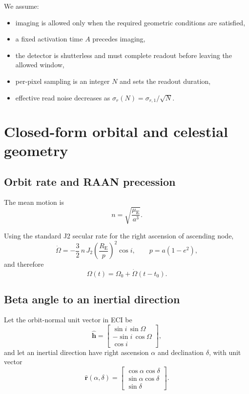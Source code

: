 \documentclass[preprint,12pt]{elsarticle}
\newcommand{\Rearth}{R_{\mathrm{E}}}
\newcommand{\muearth}{\mu_{\mathrm{E}}}
\newcommand{\Jtwo}{J_{2}}
\theoremstyle{definition}
\theoremstyle{remark}
\begin{document}
We assume:
\begin{itemize}
\item imaging is allowed only when the required geometric conditions are satisfied,
\item a fixed activation time $A$ precedes imaging,
\item the detector is shutterless and must complete readout before leaving the allowed window,
\item per-pixel sampling is an integer $N$ and sets the readout duration,
\item effective read noise decreases as $\sigma_r(N)=\sigma_{r,1}/\sqrt{N}$.
\end{itemize}

\section{Closed-form orbital and celestial geometry}

\subsection{Orbit rate and RAAN precession}

The mean motion is
\begin{equation}
n=\sqrt{\frac{\muearth}{a^3}}.
\end{equation}

Using the standard J2 secular rate for the right ascension of ascending node,
\begin{equation}
\dot{\Omega}
=
-\frac{3}{2}\,n\,\Jtwo\left(\frac{\Rearth}{p}\right)^{2}\cos i,
\qquad
p=a(1-e^{2}),
\label{eq:raan_rate}
\end{equation}
and therefore
\begin{equation}
\Omega(t)=\Omega_0+\dot{\Omega}(t-t_0).
\label{eq:raan_time}
\end{equation}

\subsection{Beta angle to an inertial direction}

Let the orbit-normal unit vector in ECI be
\begin{equation}
\hat{\mathbf{h}}
=
\begin{bmatrix}
\sin i \,\sin\Omega\\
-\sin i \,\cos\Omega\\
\cos i
\end{bmatrix},
\label{eq:hhat}
\end{equation}
and let an inertial direction have right ascension $\alpha$ and declination $\delta$, with unit vector
\begin{equation}
\hat{\mathbf{r}}(\alpha,\delta)=
\begin{bmatrix}
\cos\alpha\cos\delta\\
\sin\alpha\cos\delta\\
\sin\delta
\end{bmatrix}.
\label{eq:rhat}
\end{equation}
\end{document}
